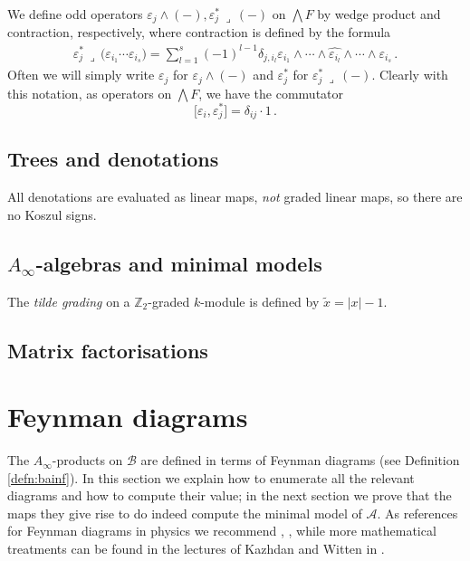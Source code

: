 \documentclass[english,letter paper,12pt,leqno]{article}
\theoremstyle{example}
\numberwithin{equation}{section}
\def\be{\begin{equation}}
\def\ee{\end{equation}}
\def\nZ{\mathds{Z}}
\begin{document}
We define odd operators $\varepsilon_j \wedge (-), \varepsilon_j^* \,\lrcorner\, (-)$ on $\bigwedge F$ by wedge product and contraction, respectively, where contraction is defined by the formula
\begin{align*}
\varepsilon_j^* \,\lrcorner\, \Big( \varepsilon_{i_1} \cdots \varepsilon_{i_s} \Big) = \sum_{l=1}^s (-1)^{l-1} \delta_{j, i_l} \varepsilon_{i_1} \wedge \cdots \wedge \widehat{ \varepsilon_{i_l} } \wedge \cdots \wedge \varepsilon_{i_s}\,.
\end{align*}
Often we will simply write $\varepsilon_j$ for $\varepsilon_j \wedge (-)$ and $\varepsilon_j^*$ for $\varepsilon_j^* \,\lrcorner\, (-)$. Clearly with this notation, as operators on $\bigwedge F$, we have the commutator
\be\label{eq:wedge_contract_comm}
\big[ \varepsilon_i, \varepsilon_j^* \big] = \delta_{ij} \cdot 1\,.
\ee

\subsection{Trees and denotations}

All denotations are evaluated as linear maps, \emph{not} graded linear maps, so there are no Koszul signs.

\subsection{$A_\infty$-algebras and minimal models}

The \emph{tilde grading} on a $\nZ_2$-graded $k$-module is defined by $\widetilde{x} = |x| - 1$. 

\subsection{Matrix factorisations}

\section{Feynman diagrams}

The $A_\infty$-products on $\mathscr{B}$ are defined in terms of Feynman diagrams (see Definition \ref{defn:bainf}). In this section we explain how to enumerate all the relevant diagrams and how to compute their value; in the next section we prove that the maps they give rise to do indeed compute the minimal model of $\mathscr{A}$. As references for Feynman diagrams in physics we recommend \cite[Ch. 6]{weinberg}, \cite[\S 4.4]{ps}, while more mathematical treatments can be found in the lectures of Kazhdan and Witten in \cite{qftstring}.
\end{document}

